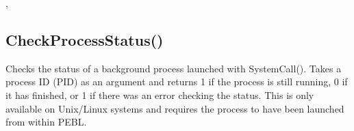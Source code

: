\documentclass[letterpaper,10pt,english]{sphinxmanual}
\begin{document}
\sphinxAtStartPar
{}

\begin{sphinxVerbatim}[commandchars=\\\{\}]
\end{sphinxVerbatim}

\sphinxAtStartPar
{}

\begin{sphinxVerbatim}[commandchars=\\\{\}]
\PYG{p}{[}\PYG{p}{]}

\PYG{p}{[}\PYG{p}{]}
\end{sphinxVerbatim}

\sphinxAtStartPar
{}

\sphinxAtStartPar
{}, 

\ignorespaces 

\subsection{CheckProcessStatus()}
\label{\detokenize{reference/peblenvironment:checkprocessstatus}}\label{\detokenize{reference/peblenvironment:index-3}}
\sphinxAtStartPar
{}

\sphinxAtStartPar
{}

\sphinxAtStartPar
Checks the status of a background process launched with SystemCall(). Takes a process ID (PID) as an argument and returns 1 if the process is still running, 0 if it has finished, or \sphinxhyphen{}1 if there was an error checking the status. This is only available on Unix/Linux systems and requires the process to have been launched from within PEBL.
\end{document}
